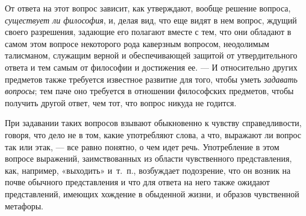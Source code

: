 От ответа на этот вопрос зависит, как утверждают, вообще решение вопроса,
{\em существует ли философия}, и, делая вид, что еще
видят в нем вопрос, ждущий своего разрешения, задающие его полагают вместе
с тем, что они обладают в самом этом вопросе некоторого рода каверзным
вопросом, неодолимым талисманом, служащим верной и обеспечивающей защитой
от утвердительного ответа и тем самым от философии и достижения ее. — И
относительно других предметов также требуется известное развитие для того,
чтобы уметь {\em задавать вопросы}; тем паче оно
требуется в отношении философских предметов, чтобы получить другой ответ,
чем тот, что вопрос никуда не годится.

При задавании таких вопросов взывают обыкновенно к чувству справедливости,
говоря, что дело не в том, какие употребляют слова, а что, выражают ли
вопрос так или этак, — все равно понятно, о чем идет речь. Употребление в
этом вопросе выражений, заимствованных из области чувственного
представления, как, например, «выходить» и~т.~п., возбуждает подозрение,
что он возник на почве обычного представления и что для ответа на него
также ожидают представлений, имеющих хождение в обыденной жизни, и образов
чувственной метафоры.

